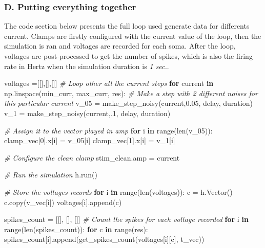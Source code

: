 \documentclass[]{article}
\newenvironment{Shaded}{}{}
\newcommand{\BuiltInTok}[1]{#1}
\newcommand{\CommentTok}[1]{\textcolor[rgb]{0.38,0.63,0.69}{\textit{#1}}}
\newcommand{\ControlFlowTok}[1]{\textcolor[rgb]{0.00,0.44,0.13}{\textbf{#1}}}
\newcommand{\DecValTok}[1]{\textcolor[rgb]{0.25,0.63,0.44}{#1}}
\newcommand{\FloatTok}[1]{\textcolor[rgb]{0.25,0.63,0.44}{#1}}
\newcommand{\KeywordTok}[1]{\textcolor[rgb]{0.00,0.44,0.13}{\textbf{#1}}}
\newcommand{\NormalTok}[1]{#1}
\newcommand{\OperatorTok}[1]{\textcolor[rgb]{0.40,0.40,0.40}{#1}}
\begin{document}
\hypertarget{d.-putting-everything-together}{%
\subsubsection{D. Putting everything
together}\label{d.-putting-everything-together}}

The code section below presents the full loop used generate data for
differents current. Clamps are firstly configured with the current value
of the loop, then the simulation is ran and voltages are recorded for
each soma. After the loop, voltages are post-processed to get the number
of spikes, which is also the firing rate in Hertz when the simulation
duration is \emph{1 sec.}.

\begin{Shaded}
\begin{Highlighting}[]
\NormalTok{voltages }\OperatorTok{=}\NormalTok{[[],[],[]]}
\CommentTok{# Loop other all the current steps}
\ControlFlowTok{for}\NormalTok{ current }\KeywordTok{in}\NormalTok{ np.linspace(min_curr, max_curr, res): }
    \CommentTok{# Make a step with 2 different noises for this particular current }
\NormalTok{    v_05 }\OperatorTok{=}\NormalTok{ make_step_noisy(current,}\FloatTok{0.05}\NormalTok{, delay, duration)}
\NormalTok{    v_1 }\OperatorTok{=}\NormalTok{ make_step_noisy(current,.}\DecValTok{1}\NormalTok{, delay, duration) }

    \CommentTok{# Assign it to the vector played in amp}
    \ControlFlowTok{for}\NormalTok{ i }\KeywordTok{in} \BuiltInTok{range}\NormalTok{(}\BuiltInTok{len}\NormalTok{(v_05)):}
\NormalTok{        clamp_vec[}\DecValTok{0}\NormalTok{].x[i] }\OperatorTok{=}\NormalTok{ v_05[i]}
\NormalTok{        clamp_vec[}\DecValTok{1}\NormalTok{].x[i] }\OperatorTok{=}\NormalTok{ v_1[i]}

    \CommentTok{# Configure the clean clamp}
\NormalTok{    stim_clean.amp }\OperatorTok{=}\NormalTok{ current}

    \CommentTok{# Run the simulation }
\NormalTok{    h.run() }

    \CommentTok{# Store the voltages records}
    \ControlFlowTok{for}\NormalTok{ i }\KeywordTok{in} \BuiltInTok{range}\NormalTok{(}\BuiltInTok{len}\NormalTok{(voltages)): }
\NormalTok{        c }\OperatorTok{=}\NormalTok{ h.Vector() }
\NormalTok{        c.copy(v_vec[i])}
\NormalTok{        voltages[i].append(c)}


\NormalTok{spikes_count }\OperatorTok{=}\NormalTok{ [[], [], []]}
\CommentTok{# Count the spikes for each voltage recorded}
\ControlFlowTok{for}\NormalTok{ i }\KeywordTok{in} \BuiltInTok{range}\NormalTok{(}\BuiltInTok{len}\NormalTok{(spikes_count)): }
    \ControlFlowTok{for}\NormalTok{ c }\KeywordTok{in} \BuiltInTok{range}\NormalTok{(res): }
\NormalTok{        spikes_count[i].append(get_spikes_count(voltages[i][c], t_vec)) }
\end{Highlighting}
\end{Shaded}
\end{document}
